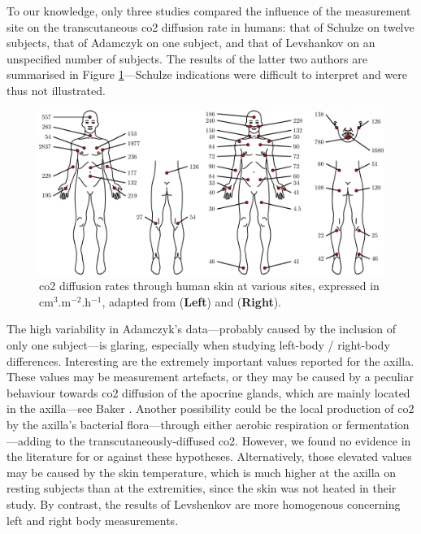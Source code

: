 To our knowledge, only three studies compared the influence of the measurement site on the transcutaneous \gls{co2} diffusion rate in humans: that of Schulze on twelve subjects\cite[Table~16]{schulze1943}, that of Adamczyk \etal{}\cite{adamczyk1966} on one subject, and that of Levshankov \etal{}\cite{levshankov1983} on an unspecified number of subjects. The results of the latter two authors are summarised in Figure \ref{fig:tcco2:positioning}---Schulze indications were difficult to interpret and were thus not illustrated.

\begin{figure}
	\centering
	\includegraphics[width=\linewidth]{1_main_matter/tcco2_figures/positioning.pdf}
	\caption[\gls{co2} diffusion rates through human skin at various sites retrieved from the literature.]{\gls{co2} diffusion rates through human skin at various sites, expressed in cm$^3$.m$^{-2}$.h$^{-1}$, adapted from \cite{adamczyk1966} (\textbf{Left}) and \cite{levshankov1983} (\textbf{Right}).}\label{fig:tcco2:positioning}
\end{figure}

The high variability in Adamczyk's data---probably caused by the inclusion of only one subject---is glaring, especially when studying left-body / right-body differences. Interesting are the extremely important values reported for the axilla. These values may be measurement artefacts, or they may be caused by a peculiar behaviour towards \gls{co2} diffusion of the apocrine glands, which are mainly located in the axilla---see Baker \etal{}\cite{baker2019}. Another possibility could be the local production of \gls{co2} by the axilla's bacterial flora---through either aerobic respiration or fermentation---adding to the transcutaneously-diffused \gls{co2}\cite{taylor2003}. However, we found no evidence in the literature for or against these hypotheses. Alternatively, those elevated values may be caused by the skin temperature, which is much higher at the axilla on resting subjects than at the extremities\cite{niu2001, sund2002}, since the skin was not heated in their study. By contrast, the results of Levshenkov \etal{} are more homogenous concerning left and right body measurements.

